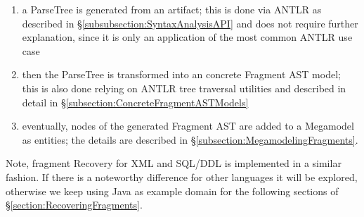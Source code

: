 \begin{enumerate}
\item
a \gls{ParseTree} is generated from an artifact; this is done via \gls{ANTLR} as described in §\ref{subsubsection:SyntaxAnalysisAPI} and does not require further explanation, since it is only an application of the most common \gls{ANTLR} use case
\item
then the \gls{ParseTree} is transformed into an concrete \gls{Fragment} \gls{AST} model; this is also done relying on \gls{ANTLR} tree traversal utilities and described in detail in §\ref{subsection:ConcreteFragmentASTModels}
\item
eventually, nodes of the generated \gls{Fragment} \gls{AST} are added to a \gls{Megamodel} as entities; the details are described in §\ref{subsection:MegamodelingFragments}.
\end{enumerate}

Note, fragment Recovery for \gls{XML} and \gls{SQL/DDL} is implemented in a similar fashion.
If there is a noteworthy difference for other languages it will be explored, otherwise we keep using \gls{Java} as example domain for the following sections of §\ref{section:RecoveringFragments}.

